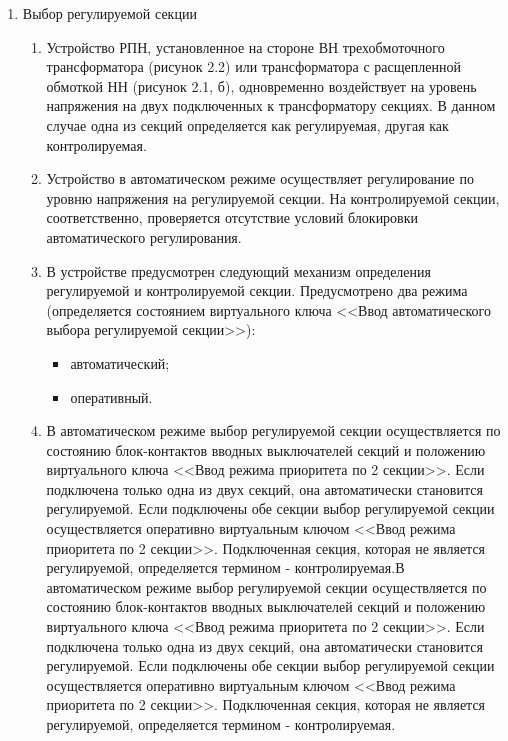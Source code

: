 \begin{enumerate}[label=\arabic{section}.\arabic{subsection}.\arabic{enumi}, labelsep=4pt, leftmargin=0pt, itemindent=57pt, itemsep=0pt, parsep=5pt]
\item Выбор регулируемой секции
    \begin{enumerate}[label=\arabic{section}.\arabic{subsection}.\arabic{enumi}.\arabic*, labelsep=4pt, leftmargin=0em, itemindent=65pt, parsep=0pt]
        \item 
        Устройство РПН, установленное на стороне ВН трехобмоточного трансформатора (рисунок 2.2) или трансформатора с расщепленной обмоткой  НН (рисунок 2.1, б), одновременно воздействует на  уровень напряжения на двух подключенных к трансформатору секциях. В данном случае одна из секций определяется как регулируемая, другая как контролируемая.
        \item
        Устройство в автоматическом режиме осуществляет регулирование по уровню напряжения на регулируемой секции. На контролируемой секции, соответственно, проверяется отсутствие условий блокировки автоматического регулирования.
        \item
        В устройстве предусмотрен следующий механизм определения регулируемой и контролируемой секции. Предусмотрено два режима (определяется состоянием виртуального ключа <<Ввод автоматического выбора регулируемой секции>>):
            \begin{itemize}
                \item автоматический;
                \item оперативный.
            \end{itemize}
        \item
        В автоматическом режиме выбор регулируемой секции осуществляется по состоянию блок-контактов вводных выключателей секций и положению виртуального ключа <<Ввод режима приоритета по 2 секции>>. Если подключена только одна из двух секций, она автоматически становится регулируемой.  Если подключены обе секции выбор регулируемой секции осуществляется оперативно виртуальным ключом <<Ввод режима приоритета по 2 секции>>. Подключенная секция, которая не является регулируемой, определяется термином - контролируемая.В автоматическом режиме выбор регулируемой секции осуществляется по состоянию блок-контактов вводных выключателей секций и положению виртуального ключа <<Ввод режима приоритета по 2 секции>>. Если подключена только одна из двух секций, она автоматически становится регулируемой.  Если подключены обе секции выбор регулируемой секции осуществляется оперативно виртуальным ключом <<Ввод режима приоритета по 2 секции>>. Подключенная секция, которая не является регулируемой, определяется термином - контролируемая.

\end{enumerate}
\end{enumerate}

